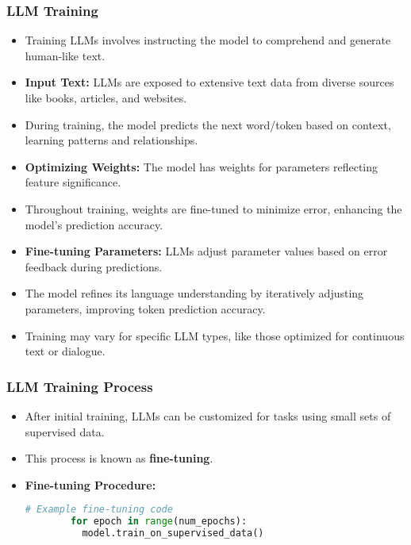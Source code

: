 \begin{frame}[fragile]\frametitle{LLM Training}
  \begin{itemize}
    \item Training LLMs involves instructing the model to comprehend and generate human-like text.
    \item \textbf{Input Text:} LLMs are exposed to extensive text data from diverse sources like books, articles, and websites.
    \item During training, the model predicts the next word/token based on context, learning patterns and relationships.
    \item \textbf{Optimizing Weights:} The model has weights for parameters reflecting feature significance.
    \item Throughout training, weights are fine-tuned to minimize error, enhancing the model's prediction accuracy.
    \item \textbf{Fine-tuning Parameters:} LLMs adjust parameter values based on error feedback during predictions.
    \item The model refines its language understanding by iteratively adjusting parameters, improving token prediction accuracy.
    \item Training may vary for specific LLM types, like those optimized for continuous text or dialogue.
  \end{itemize}
\end{frame}

\begin{frame}[fragile]\frametitle{LLM Training Process}
  \begin{itemize}
    \item After initial training, LLMs can be customized for tasks using small sets of supervised data.
    \item This process is known as \textbf{fine-tuning}.
    \item \textbf{Fine-tuning Procedure:}
      \begin{lstlisting}[language=Python]
        # Example fine-tuning code
        for epoch in range(num_epochs):
          model.train_on_supervised_data()
      \end{lstlisting}
  \end{itemize}
\end{frame}

